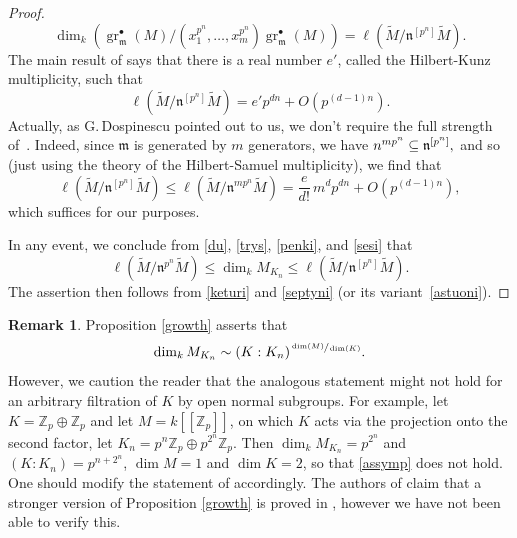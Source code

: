 \documentclass[11pt]{article}
\newcommand{\sbullet}{{\scriptscriptstyle\bullet}}
\theoremstyle{definition}
\newtheorem{remark}[prop]{Remark}
\DeclareMathOperator{\gr}{gr}
\newcommand{\br}[1]{[\![#1]\!]}
\newcommand{\Zp}{\mathbb{Z}_p}
\newcommand{\mm}{\mathfrak m}
\newcommand{\nn}{\mathfrak n}
\begin{document}
\begin{proof}
\begin{equation}\label{sesi}
\dim_k (\gr^{\sbullet}_{\mm}(M)/(x_1^{p^n}, \ldots, x_m^{p^n})\gr^{\sbullet}_{\mm}(M) )= \ell(\widetilde{M}/\nn^{[p^n]} \widetilde{M}).
\end{equation}
The main result of \cite{monsky} says that there is a real number $e'$, called the Hilbert-Kunz multiplicity, such that
\begin{equation}\label{septyni}
\ell(\widetilde{M}/\nn^{[p^n]} \widetilde{M})= e' p^{dn} + O(p^{(d-1)n}).
\end{equation}
Actually, as G.\,Dospinescu pointed out to us, we don't require the full strength
of~\cite{monsky}. Indeed, since $\mathfrak m$ is generated by $m$ generators,
we have $\mathfrak \nn^{m p^n} \subseteq \nn^{[p^n]},$
and so (just using the theory of the Hilbert-Samuel multiplicity),
we find that
\begin{equation}
\label{astuoni}
\ell(\widetilde{M}/\nn^{[p^n]} \widetilde{M})
\leq \ell(\widetilde{M}/\nn^{m p^n} \widetilde{M}) = \dfrac{e}{d!}\,m^d p^{dn}
+ O(p^{(d-1)n}),
\end{equation}
which suffices for our purposes.

In any event,
we conclude from \eqref{du}, \eqref{trys}, \eqref{penki}, and \eqref{sesi}
that
\[
\ell(\widetilde{M}/\nn^{p^n} \widetilde{M})\le \dim_k M_{K_n} \le
\ell(\widetilde{M}/\nn^{[p^n]} \widetilde{M}).
\]
The assertion then follows from
\eqref{keturi} and \eqref{septyni} (or its variant~\eqref{astuoni}). \end{proof}

\begin{remark}Proposition \ref{growth} asserts that \begin{equation}
\label{assymp} \dim_k M_{K_n}\sim (K: K_n)^{\sfrac{\dim(M)} {\dim (K)}}.
\end{equation} However, we caution the reader that the analogous statement
might not hold for an arbitrary filtration of $K$ by open normal subgroups. For
example, let $K=\Zp \oplus \Zp$ and let $M=k\br{\Zp}$, on which $K$ acts via
the projection onto the second factor, let $K_n= p^n \Zp \oplus p^{2^n} \Zp$.
Then $\dim_k M_{K_n}= p^{2^n}$ and $(K:K_n)= p^{n+2^n}$, $\dim M=1$ and $\dim
K=2$, so that \eqref{assymp} does not hold. One should modify the statement of \hbox{\cite[Th.\,1.18]{calegari-emerton}} accordingly. The authors of
\cite{calegari-emerton} claim that a stronger version of Proposition \ref{growth} is proved in
\cite[\S 5]{ardakov_brown}, however we have not been able to verify this.
\end{remark}
\end{document}

